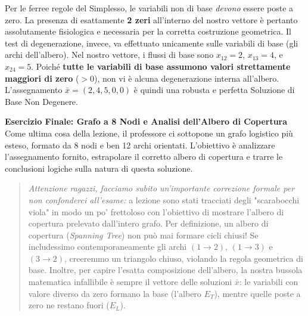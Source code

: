 \documentclass[12pt, a4paper]{article}
\newcommand{\separatore}{\noindent{\color{titlecolor!50}\rule{\textwidth}{0.6pt}}}
\begin{document}
	Per le ferree regole del Simplesso, le variabili non di base \textit{devono} essere poste a zero. La presenza di esattamente \textbf{2 zeri} all'interno del nostro vettore è pertanto assolutamente fisiologica e necessaria per la corretta costruzione geometrica. 
	Il test di degenerazione, invece, va effettuato unicamente sulle variabili di base (gli archi dell'albero). Nel nostro vettore, i flussi di base sono $x_{12}=2$, $x_{13}=4$, e $x_{24}=5$. Poiché \textbf{tutte le variabili di base assumono valori strettamente maggiori di zero} ($>0$), non vi è alcuna degenerazione interna all'albero. L'assegnamento $\bar{x} = (2,4,5,0,0)$ è quindi una robusta e perfetta Soluzione di Base Non Degenere.
	
	\vspace{0.6cm}
	\separatore
	\vspace{0.4cm}
	
	\textbf{Esercizio Finale: Grafo a 8 Nodi e Analisi dell'Albero di Copertura}\\
	Come ultima cosa della lezione, il professore ci sottopone un grafo logistico più esteso, formato da 8 nodi e ben 12 archi orientati. L'obiettivo è analizzare l'assegnamento fornito, estrapolare il corretto albero di copertura e trarre le conclusioni logiche sulla natura di questa soluzione.
	
	\begin{quote}
		\textit{Attenzione ragazzi, facciamo subito un'importante correzione formale per non confonderci all'esame:} a lezione sono stati tracciati degli "scarabocchi viola" in modo un po' frettoloso con l'obiettivo di mostrare l'albero di copertura prelevato dall'intero grafo. Per definizione, un albero di copertura (\textit{Spanning Tree}) non può mai formare cicli chiusi! Se includessimo contemporaneamente gli archi $(1\to2)$, $(1\to3)$ e $(3\to2)$, creeremmo un triangolo chiuso, violando la regola geometrica di base. Inoltre, per capire l'esatta composizione dell'albero, la nostra bussola matematica infallibile è sempre il vettore delle soluzioni $\bar{x}$: le variabili con valore diverso da zero formano la base (l'albero $E_T$), mentre quelle poste a zero ne restano fuori ($E_L$).
	\end{quote}
	
\end{document}
